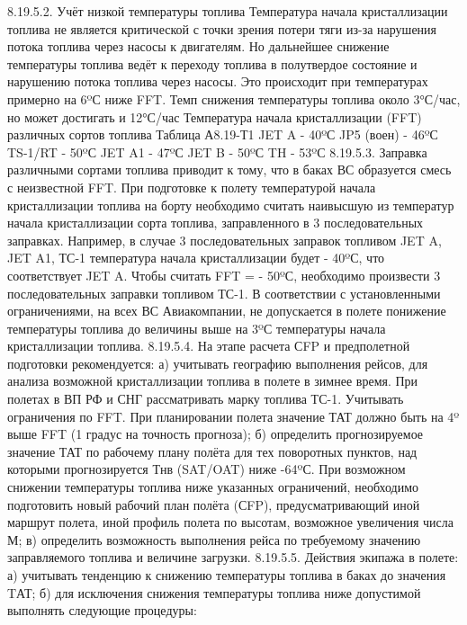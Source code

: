 8.19.5.2. Учёт низкой температуры топлива Температура начала кристаллизации топлива не является критической с точки зрения потери тяги из-за нарушения потока топлива через насосы к двигателям. Но дальнейшее снижение температуры топлива ведёт к переходу топлива в полутвердое состояние и нарушению потока топлива через насосы. Это происходит при температурах примерно на 6ºС ниже FFT.
Темп снижения температуры топлива около 3°С/час, но может достигать и 12°С/час 
Температура начала кристаллизации (FFT) различных сортов топлива
                                                                                                                             Таблица А8.19-Т1
                 JET A	- 40ºС		JP5 (воен)	- 46ºС		TS-1/RT	- 50ºС
                 JET A1	- 47ºС		JET B	- 50ºС		TH	- 53ºС
8.19.5.3. Заправка различными сортами топлива приводит к тому, что в баках ВС образуется смесь с неизвестной FFT. При подготовке к полету температурой начала кристаллизации топлива на борту необходимо считать наивысшую из температур начала кристаллизации сорта топлива, заправленного в 3 последовательных заправках.
Например, в случае 3 последовательных заправок топливом JET A, JET A1, ТС-1 температура начала кристаллизации будет - 40ºС, что соответствует JET A. Чтобы считать FFT = - 50ºС, необходимо произвести 3 последовательных заправки топливом ТС-1. В соответствии с установленными ограничениями, на всех ВС Авиакомпании, не допускается в полете понижение температуры топлива до величины выше на 3ºС температуры начала кристаллизации топлива.
8.19.5.4. На этапе расчета СFP и предполетной подготовки рекомендуется:
а)	учитывать географию выполнения рейсов, для анализа возможной кристаллизации топлива в полете в зимнее время. При полетах в ВП РФ и СНГ рассматривать марку топлива ТС-1. Учитывать ограничения по FFT. При планировании полета значение ТАТ должно быть на 4º выше FFT (1 градус на точность прогноза);
б)	определить прогнозируемое значение ТАТ по рабочему плану полёта для тех поворотных пунктов, над которыми прогнозируется Тнв (SAT/OAT) ниже -64ºС. При возможном снижении температуры топлива ниже указанных ограничений, необходимо подготовить новый рабочий план полёта (СFP), предусматривающий иной маршрут полета, иной профиль полета по высотам, возможное увеличения числа М;
в)	определить возможность выполнения рейса по требуемому значению заправляемого топлива и величине загрузки.
8.19.5.5. Действия экипажа в полете:
а)	учитывать тенденцию к снижению температуры топлива в баках до значения TАТ;
б)	для исключения снижения температуры топлива ниже допустимой выполнять следующие процедуры:
